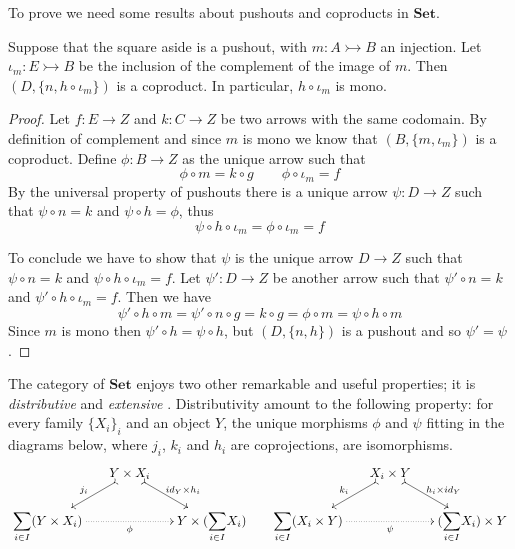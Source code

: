 \documentclass[a4paper,UKenglish,cleveref,pdftex,thm-restate,numberwithinsect]{lipics-v2021}
\newcommand{\Set}{\mathbf{Set}}
\newcommand{\Sum}{\mathlarger{\sum}}
\newcommand{\mto}{\rightarrowtail}
\newcommand{\id}[1]{\mathsf{id}_{#1}}
\begin{document}
To prove  we need some results about pushouts and coproducts in $\Set$.

\noindent 
		\parbox{11.7cm}{
\begin{lemma}\label{lem:po_set}
Suppose that the square aside is a pushout, with $m\colon A\mto B$ an injection. Let $\iota_{m}\colon E\mto B$ be the inclusion of the complement of the image of $m$. Then $(D, \{n, h\circ \iota_m \})$ is a coproduct. In particular, $h\circ \iota_m$ is mono.
\end{lemma}}\hfill \parbox{2cm}{\vspace{0cm}}
\begin{proof}
		 Let $f\colon E\to Z$ and $k\colon C\to Z$ be two arrows with the same codomain. By definition of complement and since $m$ is mono we know that $(B, \{m, \iota_m\})$ is a coproduct. Define $\phi\colon B\to Z$ as the unique arrow such that \[\phi\circ m=k\circ g \qquad \phi \circ \iota_m=f\] 
		By the universal property of pushouts there is a unique arrow $\psi \colon D\to Z$ such that $\psi \circ n=k$ and $\psi \circ h=\phi$, thus 
		\[
		\psi \circ h\circ \iota_m =\phi \circ \iota_m=f\]
		
To conclude we have to show that $\psi$ is the unique arrow $D\to Z$ such that $\psi \circ n =k$ and $\psi \circ h\circ \iota_m=f$. Let $\psi'\colon D\to Z$ be another arrow such that $\psi' \circ n=k$ and $\psi' \circ h\circ \iota_m=f$. Then we have
		\[\psi'\circ h\circ m=\psi'\circ n\circ g=k\circ g=\phi \circ m =\psi \circ h\circ m \]
	Since $m$ is mono then $\psi'\circ h=\psi \circ h$,  but $(D, \{n, h\})$ is a pushout and so $\psi'=\psi$. 
\end{proof}



The category of $\Set$ enjoys two other remarkable and useful properties; it is \emph{distributive} and \emph{extensive} \cite{carboni1993introduction}. Distributivity amount to the following property: for every family $\{X_i\}_{i}$ and an object $Y$, the unique morphisms $\phi$ and $\psi $ fitting in the diagrams below, where $j_i$, $k_i$ and $h_i$ are coprojections, are isomorphisms.
\[\xymatrix@C=15pt@R=15pt{&Y\times X_i \ar@{>->}[dl]_{j_i} \ar@{>->}[dr]^{\id{Y}\times h_i} &&& X_i \times Y \ar@{>->}[dl]_{k_i} \ar@{>->}[dr]^{ h_i \times \id{Y}} \\ \Sum_{i\in I} (Y\times X_i) \ar@{.>}[rr]_{\phi}&& Y\times (\Sum_{i\in I}X_i) & \Sum_{i\in I}  (X_i \times Y )\ar@{.>}[rr]_{\psi}&&  (\Sum_{i\in I}X_i) \times Y }\]
\end{document}
